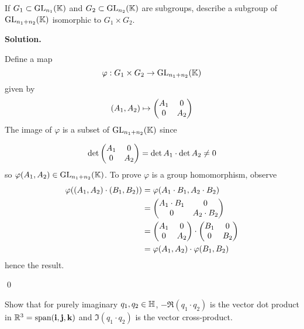 \documentclass[12pt]{book}
\theoremstyle{definition}
\newenvironment{solution}
{%
  \par\noindent\textbf{Solution.}\quad
}
{%
  \qed\par
}
\begin{document}
\begin{taggedexercise}[Complete]
  If $G_1 \subset \mathrm{GL}_{n_1}(\mathbb{K})$ and $G_2 \subset \mathrm{GL}_{n_2}(\mathbb{K})$ are subgroups, describe a subgroup of $\mathrm{GL}_{n_1 + n_2}(\mathbb{K})$ isomorphic to $G_1 \times G_2$.
\end{taggedexercise}
\begin{solution}
  Define a map 
  \[
  \varphi : G_1 \times G_2 \to \mathrm{GL}_{n_1 + n_2}(\mathbb{K}) \\
  \]
  given by
  \[
  (A_1, A_2) \mapsto \begin{pmatrix} A_1 & 0 \\ 0 & A_2 \end{pmatrix}
  \]
  The image of $\varphi$ is a subset of $\mathrm{GL}_{n_1 + n_2}(\mathbb{K})$ since

  \[
  \det \begin{pmatrix} A_1 & 0 \\ 0 & A_2 \end{pmatrix} = \det A_1 \cdot \det A_2 \neq 0
  \]
  so $\varphi(A_1, A_2) \in \mathrm{GL}_{n_1 + n_2}(\mathbb{K})$.
  To prove $\varphi$ is a group homomorphism, observe
  \[
  \begin{aligned}
    \varphi((A_1, A_2) \cdot (B_1, B_2)) &= \varphi(A_1 \cdot B_1, A_2 \cdot B_2) \\
                                         &= \begin{pmatrix} A_1 \cdot B_1 & 0 \\ 0 & A_2 \cdot B_2 \end{pmatrix} \\
                                         &= \begin{pmatrix} A_1 & 0 \\ 0 & A_2 \end{pmatrix} \cdot \begin{pmatrix} B_1 & 0 \\ 0 & B_2 \end{pmatrix} \\
                                         &= \varphi(A_1, A_2) \cdot \varphi(B_1, B_2)
  \end{aligned}
  \]    
  hence the result.

\end{solution}

\begin{taggedexercise}[TODO]
  
\end{taggedexercise}

\begin{taggedexercise}[Complete]
  Show that for purely imaginary $q_1, q_2 \in \mathbb{H}$, $-\Re (q_1 \cdot q_2)$ is the vector dot product in $\mathbb{R}^3 = \text{span}(\mathbf{i},
  \mathbf{j},\mathbf{k})$ and $\Im(q_1 \cdot q_2)$ is the vector cross-product.
\end{taggedexercise}
\end{document}
